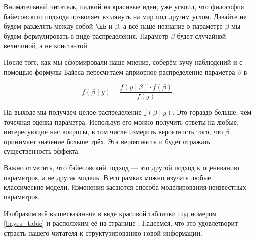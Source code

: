 Внимательный читатель, падкий на красивые идеи, уже усвоил, что философия байесовского подхода позволяет взглянуть на мир под другим углом. Давайте не будем разделять между собой $\hb$ и $\beta$, а всё наше незнание о параметре $\beta$ мы будем формулировать в виде  распределения. Параметр $\beta$ будет случайной величиной, а не константой.

После того, как мы сформировали наше мнение, соберём кучу наблюдений и с помощью формулы Байеса пересчитаем априорное распределение параметра $\beta$ в 

\[ f(\beta \mid y) = \frac{ f(y \mid \beta) \cdot f(\beta)}{f(y)}.\]

На выходе мы получаем целое распределение $f(\beta \mid y)$. Это гораздо больше, чем точечная оценка параметра. Используя его можно получить ответы на любые, интересующие нас вопросы, в том числе измерить вероятность того, что $\beta$ принимает значение больше трёх. Эта вероятность и будет отражать существенность эффекта.

Важно отметить, что байесовский подход --- это другой подход к оцениванию параметров, а не другая модель. В его рамках можно изучать любые классические модели. Изменения касаются способа моделирования неизвестных параметров.

Изобразим всё вышесказанное в виде красивой таблички под номером \ref{bayes_table} и расположим её на странице \pageref{bayes_table}. Надеемся, что это удовлетворит страсть нашего читателя к структурированию новой информации.

